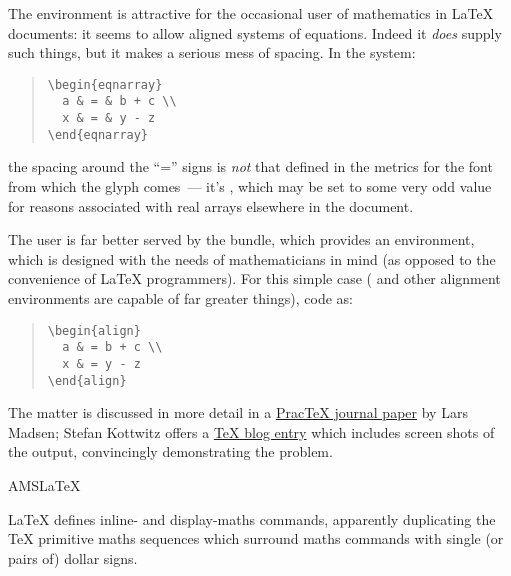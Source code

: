 
The environment  is attractive for the
occasional user of mathematics in \LaTeX{} documents: it seems to
allow aligned systems of equations.  Indeed it \emph{does} supply such
things, but it makes a serious mess of spacing.  In the system:
\begin{quote}
\begin{verbatim}
\begin{eqnarray}
  a & = & b + c \\
  x & = & y - z
\end{eqnarray}
\end{verbatim}
\end{quote}
the spacing around the ``='' signs is \emph{not} that defined in the
metrics for the font from which the glyph comes~--- it's
, which may be set to some very odd value for reasons
associated with real arrays elsewhere in the document.

The user is far better served by the \AMSLaTeX{} bundle, which
provides an  environment, which is designed with
the needs of mathematicians in mind (as opposed to the convenience of
\LaTeX{} programmers).  For this simple case ( and
other \AMSLaTeX{} alignment environments are capable of far greater
things), code as:
\begin{quote}
\begin{verbatim}
\begin{align}
  a & = b + c \\
  x & = y - z
\end{align}
\end{verbatim}
\end{quote}
The matter is discussed in more detail in a %
\href{http://tug.org/pracjourn/2006-4/madsen/madsen.pdf}{Prac\TeX{} journal paper}
by Lars Madsen; Stefan Kottwitz offers a %
\href{http://texblog.net/latex-archive/maths/eqnarray-align-environment/}{\TeX{} blog entry}
which includes screen shots of the output, convincingly demonstrating
the problem.
\begin{ctanrefs}
\item[AMSLaTeX]
\end{ctanrefs}


\LaTeX{} defines inline- and display-maths commands, apparently
duplicating the \TeX{} primitive maths sequences which surround maths
commands with single (or pairs of) dollar signs.


